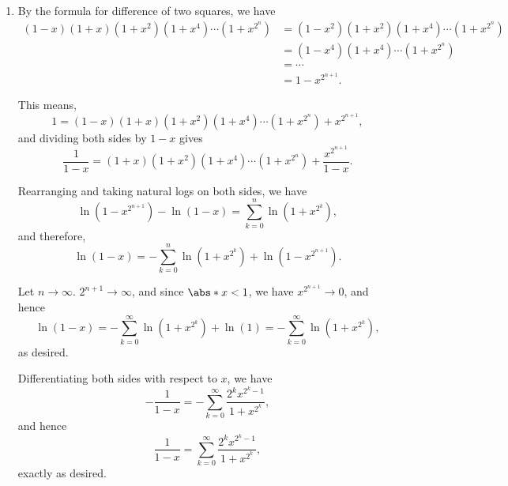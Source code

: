 \Question{\currfilebase}

\begin{enumerate}
    \item By the formula for difference of two squares, we have
          \begin{align*}
              (1 - x)(1 + x)(1 + x^2)(1 + x^4) \cdots (1 + x^{2^n}) & = (1 - x^2)(1 + x^2)(1 + x^4) \cdots (1 + x^{2^n}) \\
                                                                    & = (1 - x^4)(1 + x^4) \cdots (1 + x^{2^n})          \\
                                                                    & = \cdots                                           \\
                                                                    & = 1 - x^{2^{n + 1}}.
          \end{align*}

          This means,
          \[
              1 = (1 - x)(1 + x)(1 + x^2)(1 + x^4) \cdots (1 + x^{2^n}) + x^{2^{n + 1}},
          \]
          and dividing both sides by \(1 - x\) gives
          \[
              \frac{1}{1 - x} = (1 + x)(1 + x^2)(1 + x^4) \cdots (1 + x^{2^n}) + \frac{x^{2^{n + 1}}}{1 - x}.
          \]

          Rearranging and taking natural logs on both sides, we have
          \[
              \ln(1 - x^{2^{n + 1}}) - \ln(1 - x) = \sum_{k = 0}^{n} \ln(1 + x^{2^{k}}),
          \]
          and therefore,
          \[
              \ln(1 - x) = -\sum_{k = 0}^{n} \ln(1 + x^{2^{k}}) + \ln(1 - x^{2^{n + 1}}).
          \]

          Let \(n \to \infty\). \(2^{n + 1} \to \infty\), and since \(\abs*{x} < 1\), we have \(x^{2^{n + 1}} \to 0\), and hence
          \[
              \ln(1 - x) = -\sum_{k = 0}^{\infty} \ln(1 + x^{2^{k}}) + \ln(1) = -\sum_{k = 0}^{\infty} \ln(1 + x^{2^{k}}),
          \]
          as desired.

          Differentiating both sides with respect to \(x\), we have
          \[
              - \frac{1}{1 - x} = - \sum_{k = 0}^{\infty} \frac{2^k x^{2^k - 1}}{1 + x^{2^k}},
          \]
          and hence
          \[
              \frac{1}{1 - x} = \sum_{k = 0}^{\infty} \frac{2^k x^{2^k - 1}}{1 + x^{2^k}},
          \]
          exactly as desired.


\end{enumerate}
